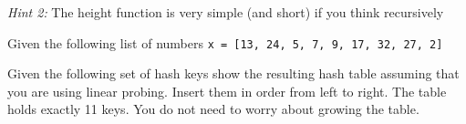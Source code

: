 \documentclass[11pt]{exam}
\begin{document}
\begin{questions}
\textit{Hint 2:} The height function is very simple (and short) if you think recursively

\newpage
\question Given the following list of numbers \lstinline{x = [13, 24, 5, 7, 9, 17, 32, 27, 2]}


\newpage
\question[10] Given the following set of hash keys show the resulting hash table assuming that you are using linear probing.  Insert them in order from left to right.  The table holds exactly 11 keys.  You do not need to worry about growing the table.


\end{questions}
\end{document}
